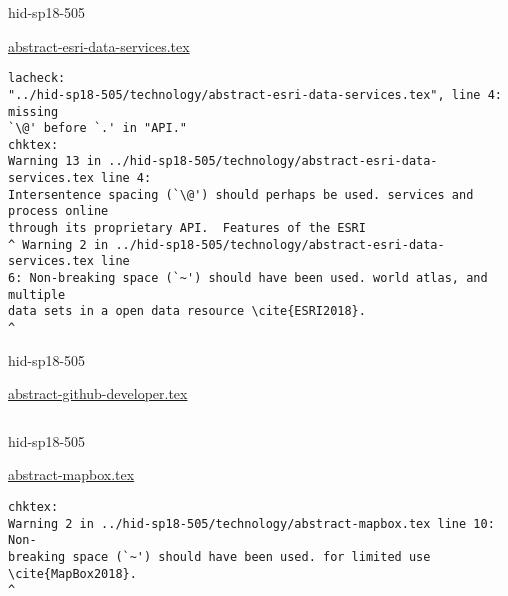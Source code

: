 \begin{IU}

hid-sp18-505

\href{https://github.com/cloudmesh-community/hid-sp18-505/blob/master//technology/abstract-esri-data-services.tex}{abstract-esri-data-services.tex}

\begin{tiny}
\begin{verbatim}
lacheck:
"../hid-sp18-505/technology/abstract-esri-data-services.tex", line 4: missing
`\@' before `.' in "API."
chktex:
Warning 13 in ../hid-sp18-505/technology/abstract-esri-data-services.tex line 4:
Intersentence spacing (`\@') should perhaps be used. services and process online
through its proprietary API.  Features of the ESRI
^ Warning 2 in ../hid-sp18-505/technology/abstract-esri-data-services.tex line
6: Non-breaking space (`~') should have been used. world atlas, and multiple
data sets in a open data resource \cite{ESRI2018}.
^
\end{verbatim}
\end{tiny}
\end{IU}



\begin{IU}

hid-sp18-505

\href{https://github.com/cloudmesh-community/hid-sp18-505/blob/master//technology/abstract-github-developer.tex}{abstract-github-developer.tex}

\begin{tiny}
\begin{verbatim}
\end{verbatim}
\end{tiny}
\end{IU}



\begin{IU}

hid-sp18-505

\href{https://github.com/cloudmesh-community/hid-sp18-505/blob/master//technology/abstract-mapbox.tex}{abstract-mapbox.tex}

\begin{tiny}
\begin{verbatim}
chktex:
Warning 2 in ../hid-sp18-505/technology/abstract-mapbox.tex line 10: Non-
breaking space (`~') should have been used. for limited use \cite{MapBox2018}.
^
\end{verbatim}
\end{tiny}
\end{IU}


